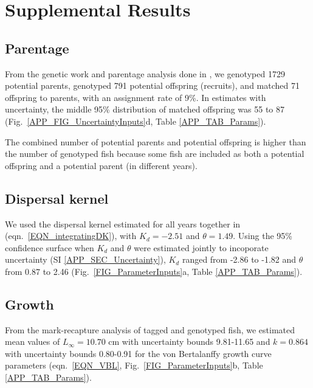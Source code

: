 \documentclass[12pt, oneside]{article}   	%
\begin{document}
\newpage{}

\section{Supplemental Results} \label{APP_SEC_RESULTS} %

\subsection{Parentage} \label{APP_SEC_RESULTS_Parentage}

From the genetic work and parentage analysis done in \cite{catalanoInPrepconnectivity}, we genotyped 1729 potential parents, genotyped 791 potential offspring (recruits), and matched 71 offspring to parents, with an assignment rate of 9\%. In estimates with uncertainty, the middle 95\% distribution of matched offspring was 55 to 87 (Fig.\ \ref{APP_FIG_UncertaintyInputs}d, Table \ref{APP_TAB_Params}).

The combined number of potential parents and potential offspring is higher than the number of genotyped fish because some fish are included as both a potential offspring and a potential parent (in different years).

\subsection{Dispersal kernel} \label{APP_SEC_RESULTS_Dispersal}

We used the dispersal kernel estimated for all years together in \cite{catalanoInPrepconnectivity} (eqn.\ \ref{EQN_integratingDK}), with $K_d = -2.51$ and $\theta = 1.49$. Using the 95\% confidence surface when $K_d$ and $\theta$ were estimated jointly to incoporate uncertainty (SI \ref{APP_SEC_Uncertainty}), $K_d$ ranged from -2.86 to -1.82 and $\theta$ from 0.87 to 2.46 (Fig.\ \ref{FIG_ParameterInputs}a, Table \ref{APP_TAB_Params}).

\subsection{Growth} \label{APP_SEC_RESULTS_Growth}

From the mark-recapture analysis of tagged and genotyped fish, we estimated mean values of $L_\infty = 10.70$ cm with uncertainty bounds 9.81-11.65 and $k = 0.864$ with uncertainty bounds 0.80-0.91 for the von Bertalanffy growth curve parameters (eqn.\ \ref{EQN_VBL}, Fig.\ \ref{FIG_ParameterInputs}b, Table \ref{APP_TAB_Params}). 
\end{document}
